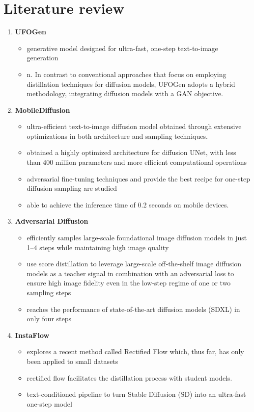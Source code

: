 \documentclass[11pt]{article}
\begin{document}
\section{Literature review}
\begin{enumerate}
    \item \textbf{UFOGen}\cite{xu2024ufogen} 
    \begin{itemize}
        \item generative model designed for ultra-fast, one-step text-to-image generation
        \item n. In contrast to conventional approaches that focus on employing distillation techniques for diffusion models, UFOGen adopts a hybrid methodology, integrating diffusion models with a GAN objective.
    \end{itemize}
    \item \textbf{MobileDiffusion}\cite{zhao2024mobilediffusioninstanttexttoimagegeneration} 
    \begin{itemize}
        \item  ultra-efficient
text-to-image diffusion model obtained through extensive optimizations
in both architecture and sampling techniques.
\item obtained a highly optimized architecture for diffusion UNet, with less than
400 million parameters and more efficient computational operations
\item adversarial fine-tuning techniques
and provide the best recipe for one-step diffusion sampling are studied
\item able to achieve the inference time of 0.2 seconds
on mobile devices.
    \end{itemize}
\item \textbf{Adversarial Diffusion } \cite{sauer2023adversarialdiffusiondistillation}
\begin{itemize}
    \item efficiently samples large-scale
foundational image diffusion models in just 1–4 steps while
maintaining high image quality
\item  use score distillation
to leverage large-scale off-the-shelf image diffusion models
as a teacher signal in combination with an adversarial loss
to ensure high image fidelity even in the low-step regime
of one or two sampling steps
\item reaches the
performance of state-of-the-art diffusion models (SDXL) in
only four steps

\end{itemize}
\item \textbf{InstaFlow} \cite{liu2024instaflowstephighqualitydiffusionbased}
\begin{itemize}
    \item explores a recent method called Rectified Flow which, thus far, has only been applied to small datasets
    \item rectified flow facilitates the distillation process with student models.
    \item text-conditioned pipeline
to turn Stable Diffusion (SD) into an ultra-fast one-step model
\end{itemize}


\end{enumerate}
\end{document}

